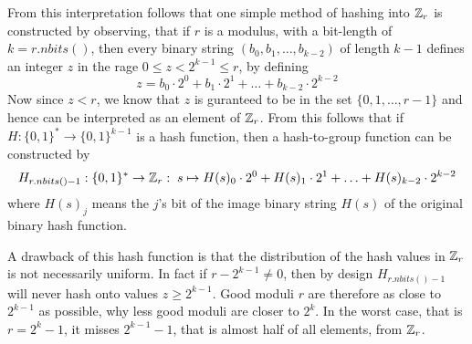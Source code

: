 From this interpretation follows that one simple method of hashing into $\mathbb{Z}_r$ is constructed by observing, that if $r$ is a modulus, with a bit-length of $k=r.nbits()$, then every binary string $(b_0,b_1,\ldots,b_{k-2})$ of length $k-1$ defines an integer $z$ in the rage $0\leq z < 2^{k-1}\leq r $, by defining
\begin{equation}
z = b_0\cdot 2^0 + b_1\cdot 2^1 + \ldots + b_{k-2}\cdot 2^{k-2}
\end{equation}
Now since $z<r$, we know that $z$ is guranteed to be in the set $\{0,1,\ldots,r-1\}$ and hence can be interpreted as an element of $\mathbb{Z}_r$. From this follows that if $H:\{0,1\}^*\to\{0,1\}^{k-1}$ is a hash function, then a hash-to-group function can be constructed by
\begin{equation}
H_{r.nbits()-1}: \{0,1\}^* \to \mathbb{Z}_r: \; s \mapsto 
H(s)_0\cdot 2^0 + H(s)_1\cdot 2^1 + \ldots + H(s)_{k-2}\cdot 2^{k-2}
\end{equation}
where $H(s)_j$ means the $j$'s bit of the image binary string $H(s)$ of the original binary hash function. 

A drawback of this hash function is that the distribution of the hash values in $\mathbb{Z}_r$ is not necessarily uniform. In fact if $r-2^{k-1}\neq 0$, then by design $H_{r.nbits()-1}$ will never hash onto values $z\geq 2^{k-1}$. Good moduli $r$ are therefore as close to $2^{k-1}$ as possible, why less good moduli are closer to $2^k$. In the worst case, that is $r=2^k-1$, it misses $2^{k-1}-1$, that is almost half of all elements, from $\mathbb{Z}_r$.

